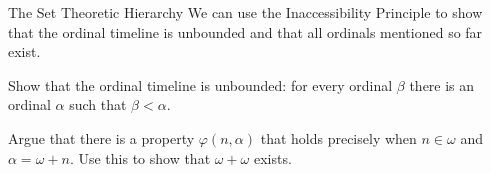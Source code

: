 \begin{unit}{The Set Theoretic Hierarchy}
We can use the Inaccessibility Principle to show that the ordinal timeline is unbounded and that all ordinals mentioned so far exist.

\begin{problem}
  Show that the ordinal timeline is unbounded: for every ordinal \(\beta\) there is an ordinal \(\alpha\) such that \(\beta < \alpha.\)
\end{problem}

\begin{problem}
  Argue that there is a property \(\varphi(n,\alpha)\) that holds precisely when \(n \in \omega\) and \(\alpha = \omega+n.\)
  Use this to show that \(\omega+\omega\) exists.
\end{problem}

\end{unit}
\endinput

